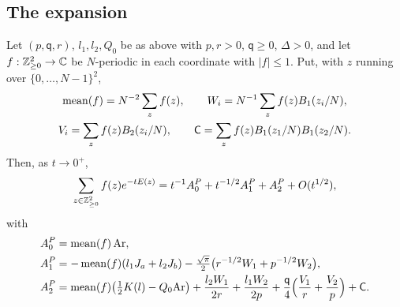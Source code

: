 \subsection{The expansion}
\begin{theorem}\label{thm:piece}
Let $(p,\mathsf q,r)$, $l_1,l_2,Q_0$ be as above with $p,r>0$, $\mathsf q\ge0$, $\Delta>0$, and let $f:\mathbb{Z}^2_{\ge0}\to\mathbb{C}$ be $N$-periodic in each coordinate
with $|f|\le1$. Put, with $z$ running over $\{0,\dots,N-1\}^2$,
\begin{gather*}
\operatorname{mean}(f)=N^{-2}\sum_zf(z),\qquad W_i=N^{-1}\sum_zf(z)B_1(z_i/N),\\
V_i=\sum_zf(z)B_2(z_i/N),\qquad \mathsf C=\sum_zf(z)B_1(z_1/N)B_1(z_2/N).
\end{gather*}
Then, as $t\to0^+$,
\[
\sum_{z\in\mathbb{Z}^2_{\ge0}}f(z)e^{-tE(z)}=t^{-1}A_{0}^{P}+t^{-1/2}A_{1}^{P}+A_{2}^{P}+O(t^{1/2}),
\]
with
\begin{align*}
A_0^P&=\operatorname{mean}(f)\,\mathrm{Ar},\\
A_1^P&=-\operatorname{mean}(f)(l_1J_a+l_2J_b)-\tfrac{\sqrt\pi}2\bigl(r^{-1/2}W_1+p^{-1/2}W_2\bigr),\\
A_2^P&=\operatorname{mean}(f)\bigl(\tfrac12K(l)-Q_0\mathrm{Ar}\bigr)+\frac{l_2W_1}{2r}+\frac{l_1W_2}{2p}+\frac{\mathsf q}4\Bigl(\frac{V_1}r+\frac{V_2}p\Bigr)+\mathsf C .
\end{align*}
\end{theorem}
